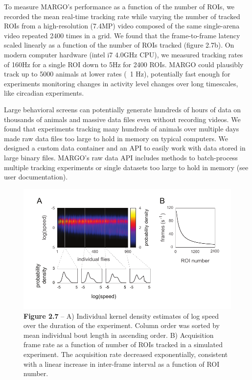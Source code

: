 \documentclass[12pt,letterpaper]{article}
\begin{document}
To measure MARGO's performance as a function of the number of ROIs, we recorded the mean real-time tracking rate while varying the number of tracked ROIs from a high-resolution (7.4MP) video composed of the same single-arena video repeated 2400 times in a grid. We found that the frame-to-frame latency scaled linearly as a function of the number of ROIs tracked (figure 2.7b). On modern computer hardware (intel i7 4.0GHz CPU), we measured tracking rates of 160Hz for a single ROI down to 5Hz for 2400 ROIs. MARGO could plausibly track up to 5000 animals at lower rates (~1 Hz), potentially fast enough for experiments monitoring changes in activity level changes over long timescales, like circadian experiments.

Large behavioral screens can potentially generate hundreds of hours of data on thousands of animals and massive data files even without recording videos. We found that experiments tracking many hundreds of animals over multiple days made raw data files too large to hold in memory on typical computers. We designed a custom data container and an API to easily work with data stored in large binary files. MARGO's raw data API includes methods to batch-process multiple tracking experiments or single datasets too large to hold in memory (see user documentation).

\begin{figure}[t!]
 \includegraphics[width=\textwidth]{../figures/chapter_2/fig_2-7.pdf}
 \vspace{.1in}
 \caption*{\textbf{Figure 2.7} -- A) Individual kernel density estimates of log speed over the duration of the experiment. Column order was sorted by mean individual bout length in ascending order. B) Acquisition frame rate as a function of number of ROIs tracked in a simulated experiment. The acquisition rate decreased exponentially, consistent with a linear increase in inter-frame interval as a function of ROI number.}
\end{figure}
\end{document}
